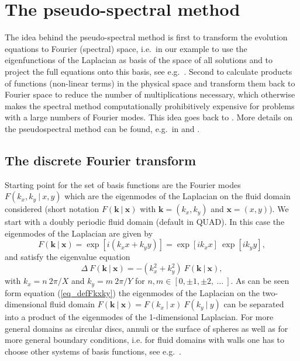 \chapter{The pseudo-spectral method} \label{sec_pseudspec}
The idea behind the pseudo-spectral method is first to transform
the evolution equations to Fourier (spectral) space, i.e.\ in our
example to use the eigenfunctions of the Laplacian as basis of the
space of all solutions and to project the full equations onto this basis,
see e.g.\ \cite{canutoetal1988}. Second to calculate products of functions
(non-linear terms) in the physical space and transform them back
to Fourier space to reduce the number of multiplications necessary,
which otherwise makes the spectral method computationally prohibitively
expensive for problems with a large numbers of Fourier modes. This idea
goes back to \cite{kreissandoliger1972}. More details on the
pseudospectral method can be found, e.g.\ in \cite{orszag1972}
and \cite{fornberg1987}.

\section{The discrete Fourier transform}
\label{ssec_evolfourier}
Starting point for the set of basis functions are the Fourier modes 
$F(k_{x},k_{y} \ | \ x,y)$ which are the eigenmodes of the Laplacian 
on the fluid domain considered (short notation 
$F(\mathbf{k} \ | \ \mathbf{x})$ with 
$\mathbf{k} = (k_{x},k_{y})$ and $\mathbf{x} = (x,y)$).  
We start with a doubly periodic fluid domain (default in QUAD). 
In this case the eigenmodes of the Laplacian are given by
\begin{equation} \label{eq_defFkxky}
  F(\mathbf{k} \ | \ \mathbf{x}) 
   = 
 \exp \left[ i  \left(k_{x} x + k_{y} y \right) \right]
   = 
 \exp \left[ i k_{x} x \right] \ 
 \exp \left[ i k_{y} y \right],
\end{equation}
and satisfy the eigenvalue equation
\begin{equation} \label{eq_eigFkxky}
 \Delta \ F(\mathbf{k} \ | \ \mathbf{x})
   =
  - \left( k_{x}^{2} + k_{y}^{2} \right) \ 
    F(\mathbf{k} \ | \ \mathbf{x}),
\end{equation}
with $k_{x} = n \ 2 \pi/X$ and $k_{y} = m \ 2 \pi/Y$ for 
$n,m \in [0,\pm 1, \pm 2,\ \dots \ ]$. As can be seen form equation 
(\ref{eq_defFkxky}) the eigenmodes of the Laplacian on the 
two-dimensional fluid domain 
$F(\mathbf{k} \ | \ \mathbf{x}) = F(k_{x} \ | \ x) \ F(k_{y} \ | \ y)$
can be separated into a product of the eigenmodes of the 
1-dimensional Laplacian. For more general domains
as circular discs, annuli or the surface of spheres as well as 
for more general boundary conditions, i.e. for fluid domains with walls 
one has to choose other systems of basis functions, 
see e.g.\ \cite{canutoetal1988}.

